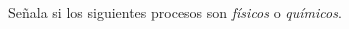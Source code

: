 \documentclass[12pt,addpoints]{evalua}
\begin{document}
\begin{questions}










      \question[5] Señala si los siguientes procesos son \textit{físicos} o \textit{químicos}.
      \begin{multicols}{2}
            \begin{parts}

\end{parts}
\end{multicols}
\end{questions}
\end{document}
